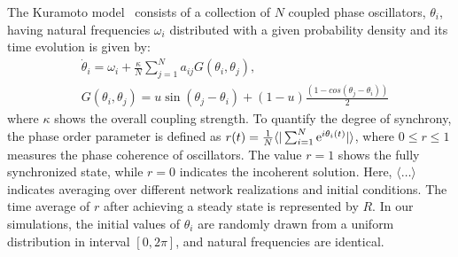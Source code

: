 \documentclass[a0paper,portrait]{baposter}
\begin{document}
\begin{poster}


{
The Kuramoto model~\cite{kuramoto2003chemical} consists of a collection of $N$ coupled phase oscillators, $\theta_i$, having natural frequencies $\omega_i$  distributed
with a given probability density and its time evolution is given by:
\begin{align*}
&\dot{\theta}_i=\omega_i+\frac{\kappa}{N} \displaystyle {\sum_{j=1}^{N} a_{ij} G(\theta_i,\theta_j) ,}\\
& G(\theta_i,\theta_j)= u\sin(\theta_j-\theta_i)+(1-u)\frac{(1-cos(\theta_j-\theta_i))}{2}
\end{align*}
where $\kappa$ shows the overall coupling strength. 
To quantify the degree of synchrony, the phase order parameter is defined as $r(t)= {1\over N} {\langle | \sum_{i=1}^{N} \mathrm{e}^{i\theta_{i}(t)}| \rangle}$,  where $0\leq r\leq{1}$ measures the phase coherence of oscillators. The value $r=1$ shows the fully synchronized state, while $r=0$ indicates the incoherent solution. Here, $\langle\dots\rangle$ indicates averaging over different network realizations and initial conditions. The time average of $r$ after achieving a steady state is represented  by $R$. In our simulations, the initial values of $\theta_i$ are randomly drawn from a uniform distribution in interval $[0, 2\pi]$, and natural frequencies are identical.
}


\end{poster}
\end{document}
